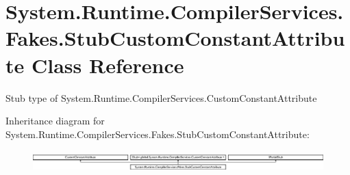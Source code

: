 \hypertarget{class_system_1_1_runtime_1_1_compiler_services_1_1_fakes_1_1_stub_custom_constant_attribute}{\section{System.\-Runtime.\-Compiler\-Services.\-Fakes.\-Stub\-Custom\-Constant\-Attribute Class Reference}
\label{class_system_1_1_runtime_1_1_compiler_services_1_1_fakes_1_1_stub_custom_constant_attribute}
}


Stub type of System.\-Runtime.\-Compiler\-Services.\-Custom\-Constant\-Attribute 


Inheritance diagram for System.\-Runtime.\-Compiler\-Services.\-Fakes.\-Stub\-Custom\-Constant\-Attribute\-:\begin{figure}[H]
\begin{center}
\leavevmode
\includegraphics[height=0.842739cm]{class_system_1_1_runtime_1_1_compiler_services_1_1_fakes_1_1_stub_custom_constant_attribute}
\end{center}
\end{figure}
